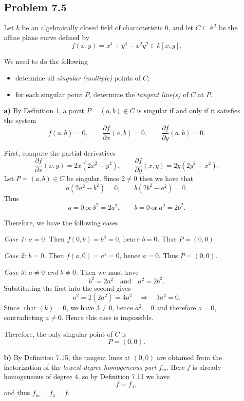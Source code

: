 \documentclass[a4paper,12pt,openany]{article}
\theoremstyle{plain}
\theoremstyle{definition}
\theoremstyle{remark}
\begin{document}
\subsection*{Problem 7.5}

Let $k$ be an algebraically closed field of characteristic $0$, and let
$C\subseteq \mathbb{A}^2$ be the affine plane curve defined by
\[
f(x,y)=x^4+y^4-x^2y^2 \in k[x,y].
\]

We need to do the following
\begin{itemize}
\item[a)] determine all \emph{singular (multiple)} points of $C$;
\item[b)] for each singular point $P$, determine the \emph{tangent line(s)} of $C$ at $P$.
\end{itemize}

\medskip

\textbf{a)}
By Definition 1, a point $P=(a,b)\in C$ is singular if and only if it satisfies the system
\[
f(a,b)=0,\qquad \frac{\partial f}{\partial x}(a,b)=0,\qquad \frac{\partial f}{\partial y}(a,b)=0.
\]

First, compute the partial derivatives
\[
\frac{\partial f}{\partial x}(x,y)=2x(2x^{2}-y^{2}),
\qquad
\frac{\partial f}{\partial y}(x,y)=2y(2y^{2}-x^{2}).
\]
Let $P=(a,b)\in C$ be singular. Since $2\neq 0$ then we have that
\[
a(2a^{2}-b^{2})=0,
\qquad
b(2b^{2}-a^{2})=0.
\]
Thus
\[
a=0 \ \text{or}\ b^{2}=2a^{2},
\qquad
b=0 \ \text{or}\ a^{2}=2b^{2}.
\]

Therefore, we have the following cases

\emph{Case 1: $a=0$.} Then $f(0,b)=b^{4}=0$, hence $b=0$. Thus $P=(0,0)$.

\emph{Case 2: $b=0$.} Then $f(a,0)=a^{4}=0$, hence $a=0$. Thus $P=(0,0)$.

\emph{Case 3: $a\neq 0$ and $b\neq 0$.} Then we must have
\[
b^{2}=2a^{2}\quad\text{and}\quad a^{2}=2b^{2}.
\]
Substituting the first into the second gives
\[
a^{2}=2(2a^{2})=4a^{2}\quad\Longrightarrow\quad 3a^{2}=0.
\]
Since $\operatorname{char}(k)=0$, we have $3\neq 0$, hence $a^{2}=0$ and therefore $a=0$,
contradicting $a\neq 0$. Hence this case is impossible.

Therefore, the only singular point of $C$ is
\[
P=(0,0).
\]

\medskip

\textbf{b)} By Definition 7.15, the tangent lines at $(0,0)$ are obtained from the factorization of the \emph{lowest-degree homogeneous part} $f_m$.
Here $f$ is already homogeneous of degree $4$, so by Definition 7.11 we have
\[
f=f_4,
\]
and thus $f_m=f_4=f$. 
\end{document}
